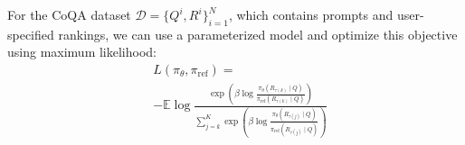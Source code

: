 For the CoQA dataset \(\mathcal{D} = \{Q^{i}, R^{i}\}_{i=1}^{N}\), which contains prompts and user-specified rankings, we can use a parameterized model and optimize this objective using maximum likelihood:
\begin{equation}
\begin{aligned}
   & L(\pi_\theta, \pi_{\text{ref}}) = \\
    & -\mathbb{E}  \log \frac{\exp \left( \beta \log \frac{\pi_\theta(R_{\tau(k)} \mid Q)}{\pi_{\text{ref}}(R_{\tau(k)} \mid Q)} \right)}{\sum_{j=k}^K \exp \left( \beta \log \frac{\pi_\theta(R_{\tau(j)} \mid Q)}{\pi_{\text{ref}}(R_{\tau(j)} \mid Q)} \right)} 
\end{aligned}
\end{equation}
